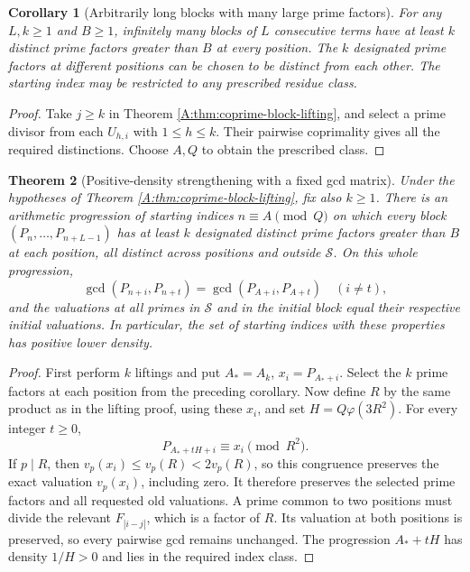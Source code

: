 \documentclass[11pt,a4paper]{article}
\newtheorem{theorem}{Theorem}[section]
\newtheorem{corollary}[theorem]{Corollary}
\theoremstyle{definition}
\theoremstyle{remark}
\numberwithin{equation}{section}
\begin{document}
\begin{corollary}[Arbitrarily long blocks with many large prime factors]
\label{A:cor:large-factor-block}
For any $L,k\ge1$ and $B\ge1$, infinitely many blocks of $L$ consecutive
terms have at least $k$ distinct prime factors greater than $B$ at every
position. The $k$ designated prime factors at different positions can
be chosen to be distinct from each other. The starting index may be
restricted to any prescribed residue class.
\end{corollary}
\begin{proof}
Take $j\ge k$ in Theorem \ref{A:thm:coprime-block-lifting}, and select a
prime divisor from each $U_{h,i}$ with $1\le h\le k$. Their pairwise
coprimality gives all the required distinctions. Choose $A,Q$ to obtain
the prescribed class.
\end{proof}

\begin{theorem}[Positive-density strengthening with a fixed gcd matrix]
\label{A:thm:positive-density-blocks}
Under the hypotheses of Theorem \ref{A:thm:coprime-block-lifting}, fix also
$k\ge1$. There is an arithmetic progression of starting indices
$n\equiv A\pmod Q$ on which every block $(P_n,\ldots,P_{n+L-1})$ has
at least $k$ designated distinct prime factors greater than $B$ at each
position, all distinct across positions and outside $\mathcal S$.
On this whole progression,
\[
 \gcd(P_{n+i},P_{n+t})=\gcd(P_{A+i},P_{A+t})\quad(i\ne t),
\]
and the valuations at all primes in $\mathcal S$ and in the initial
block equal their respective initial valuations. In particular, the set
of starting indices with these properties has positive lower density.
\end{theorem}
\begin{proof}
First perform $k$ liftings and put $A_*=A_k$, $x_i=P_{A_*+i}$. Select
the $k$ prime factors at each position from the preceding corollary.
Now define $R$ by the same product as in the lifting proof, using these
$x_i$, and set $H=Q\varphi(3R^2)$. For every integer $t\ge0$,
\[
 P_{A_*+tH+i}\equiv x_i\pmod{R^2}.
\]
If $p\mid R$, then $v_p(x_i)\le v_p(R)<2v_p(R)$, so this congruence
preserves the exact valuation $v_p(x_i)$, including zero. It therefore
preserves the selected prime factors and all requested old valuations.
A prime common to two positions must divide the relevant $F_{|i-j|}$,
which is a factor of $R$. Its valuation at both positions is preserved,
so every pairwise gcd remains unchanged. The progression
$A_*+tH$ has density $1/H>0$ and lies in the required index class.
\end{proof}
\end{document}
